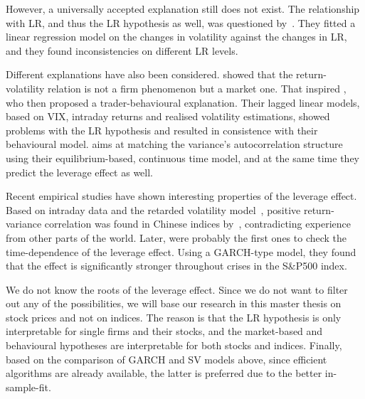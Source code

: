 However, a universally accepted explanation still does not exist.
The relationship with LR, and thus the LR hypothesis as well, was questioned by~\citet{figlewski2000leverage}.
They fitted a linear regression model on the changes in volatility against the changes in LR, and they found inconsistencies on different LR levels.

Different explanations have also been considered. \citet{dennis2006stock} showed that the return-volatility relation is not a firm phenomenon but a market one.
That inspired \citet{Hibbert2008}, who then proposed a trader-behavioural explanation.
Their lagged linear models, based on VIX, intraday returns and realised volatility estimations, showed problems with the LR hypothesis and resulted in consistence with their behavioural model.
\citet{bollerslev2011volatility} aims at matching the variance's autocorrelation structure using their equilibrium-based, continuous time model, and at the same time they predict the leverage effect as well.

Recent empirical studies have shown interesting properties of the leverage effect.
Based on intraday data and the retarded volatility model~\citep{Bouchaud2001}, positive return-variance correlation was found in Chinese indices by~\citet{Shen2009}, contradicting experience from other parts of the world.
Later, \citet{Christensen2015} were probably the first ones to check the time-dependence of the leverage effect.
Using a GARCH-type model, they found that the effect is significantly stronger throughout crises in the S\&P500 index.

We do not know the roots of the leverage effect.
Since we do not want to filter out any of the possibilities, we will base our research in this master thesis on stock prices and not on indices.
The reason is that the LR hypothesis is only interpretable for single firms and their stocks, and the market-based and behavioural hypotheses are interpretable for both stocks and indices.
Finally, based on the comparison of GARCH and SV models above, since efficient algorithms are already available, the latter is preferred due to the better in-sample-fit.
